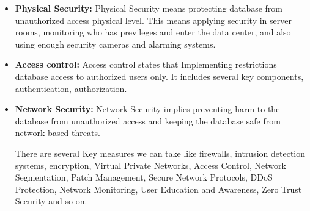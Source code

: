 \documentclass[12pt]{book} %
\begin{document}
\begin{itemize}
		\item \textbf{Physical Security:} Physical Security means protecting database from unauthorized access physical level. This means applying security in server rooms, monitoring who has previleges and enter the data center, and also using enough security cameras and alarming systems.
		
		
		\item \textbf{Access control:} Access control states that Implementing restrictions database access to authorized users only. It includes several key components, authentication, authorization.

        \item \textbf{Network Security:} Network Security implies preventing harm to the database from unauthorized access and keeping the database safe from network-based threats. 
        
        There are several Key measures we can take like firewalls, intrusion detection systems, encryption, Virtual Private Networks, Access Control, Network Segmentation, Patch Management, Secure Network Protocols, DDoS Protection, Network Monitoring, User Education and Awareness, Zero Trust Security and so on.
\end{itemize}
\end{document}
